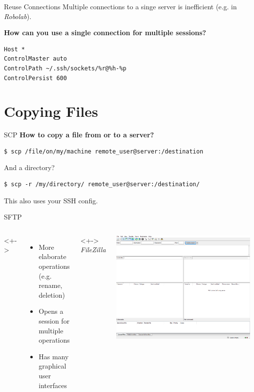 \documentclass[10pt, graphics, aspectratio=169, table]{beamer}
\begin{document}
\begin{frame}[fragile]{Reuse Connections}
	Multiple connections to a singe server is inefficient (e.g. in \emph{Robolab}).
	\pause

	\textbf{How can you use a single connection for multiple sessions?}
	\begin{lstlisting}
Host *
ControlMaster auto
ControlPath ~/.ssh/sockets/%r@%h-%p
ControlPersist 600
	\end{lstlisting}
\end{frame}

\section{Copying Files}
\begin{frame}[fragile]{SCP}
	\textbf{How to copy a file from or to a server?}
	\pause

	\begin{lstlisting}
$ scp /file/on/my/machine remote_user@server:/destination
	\end{lstlisting}
	\pause

	And a directory?
	\begin{lstlisting}
$ scp -r /my/directory/ remote_user@server:/destination/
	\end{lstlisting}
	This also uses your SSH config.
\end{frame}

\begin{frame}[fragile]{SFTP}
	\begin{columns}
	<+->
		\begin{itemize}
			\item
				More elaborate operations\\
				(e.g. rename, deletion)
			\item Opens a session for multiple operations
			\item Has many graphical user interfaces
		\end{itemize}
	<+->
		\centering
		\emph{FileZilla}	 \cite{filezilla}
		\vspace{1ex}

		\includegraphics[width=\textwidth]{img/filezilla.png}
	\end{columns}
\end{frame}
\end{document}
